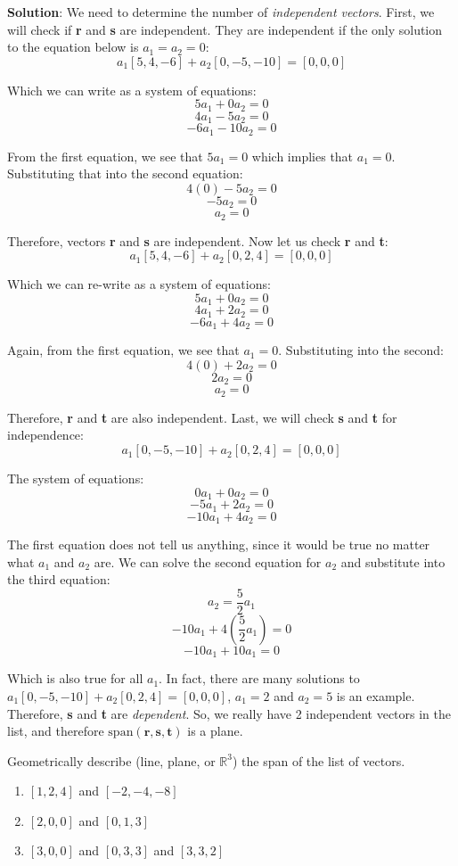 \textbf{Solution}: We need to determine the number of \textit{independent 
vectors}. First, we will check if \textbf{r} and \textbf{s} are independent. 
They are independent if the only solution to the equation below is $a_1 = a_2 
= 0$:
$$a_1 \left[5, 4, -6 \right] + a_2 \left[ 0, -5, -10 \right] = \left[ 0, 0, 0 
\right]$$

Which we can write as a system of equations:
$$5a_1 + 0a_2 = 0$$
$$4a_1 - 5a_2 = 0$$
$$-6a_1 -10a_2 = 0$$

From the first equation, we see that $5a_1 = 0$ which implies that $a_1 = 0$. 
Substituting that into the second equation:
$$4(0) - 5a_2 = 0$$
$$-5a_2 = 0$$
$$a_2 = 0$$

Therefore, vectors \textbf{r} and \textbf{s} are independent. Now let us check 
\textbf{r} and \textbf{t}:
$$a_1 \left[5, 4, -6 \right] + a_2 \left[ 0, 2, 4 \right] = \left[ 0, 0, 0 
\right]$$

Which we can re-write as a system of equations:
$$5a_1 + 0a_2 = 0$$
$$4a_1 + 2a_2 = 0$$
$$-6a_1 + 4a_2 = 0$$

Again, from the first equation, we see that $a_1 = 0$. Substituting into the 
second:
$$4(0) + 2a_2 = 0$$
$$2a_2 = 0$$
$$a_2 = 0$$

Therefore, \textbf{r} and \textbf{t} are also independent. Last, we will check 
\textbf{s} and \textbf{t} for independence:
$$a_1 \left[0, -5, -10 \right] + a_2 \left[ 0, 2, 4 \right] = \left[ 0, 0, 0 
\right]$$

The system of equations:
$$0a_1 + 0a_2 = 0$$
$$-5a_1 + 2a_2 = 0$$
$$-10a_1 + 4a_2 = 0$$

The first equation does not tell us anything, since it would be true no matter 
what $a_1$ and $a_2$ are. We can solve the second equation for $a_2$ and 
substitute into the third equation:
$$a_2 = \frac{5}{2}a_1$$
$$-10a_1 + 4 \left(\frac{5}{2}a_1 \right) = 0$$
$$-10a_1 + 10a_1 = 0$$

Which is also true for all $a_1$. In fact, there are many solutions to $a_1 
\left[0, -5, -10 \right] + a_2 \left[ 0, 2, 4 \right] = \left[ 0, 0, 0 
\right]$, $a_1 = 2$ and $a_2 = 5$ is an example. Therefore, \textbf{s} and 
\textbf{t} are \textit{dependent}. So, we really have 2 independent vectors in 
the list, and therefore $\text{span}(\mathbf{r}, \mathbf{s}, \mathbf{t})$ is a 
plane. 

\begin{Exercise}[title = {Determining Span}, label = span1]
Geometrically describe (line, plane, or $\mathbb{R}^3$) the span of the list 
of vectors.
\begin{enumerate}
\item $\left[ 1, 2, 4 \right]$ and $\left[-2, -4, -8 \right]$
\item $\left[ 2, 0, 0 \right]$ and $\left[ 0, 1, 3 \right]$
\item $\left[ 3, 0, 0 \right]$ and $\left[ 0, 3, 3 \right]$ and $\left[3, 3, 2 
\right]$
\end{enumerate}
\end{Exercise}


